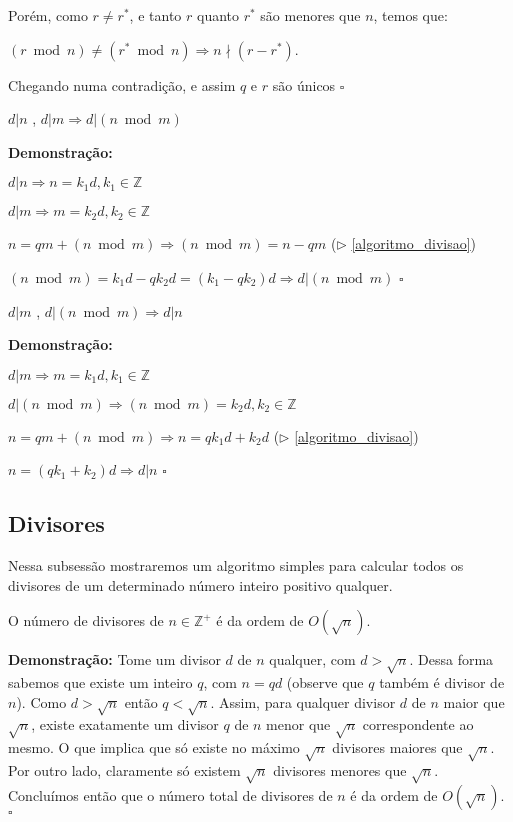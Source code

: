 Porém, como $r \neq r^*$, e tanto $r$ quanto $r^*$ são menores que $n$, temos que: 

$(r\bmod n) \neq (r^*\bmod n) \Rightarrow n \nmid (r - r^*)$.

Chegando numa contradição, e assim $q$ e $r$ são únicos $\square$ \\

\begin{corollary}\label{divisibilidade_modular}
$d|n$ , $d|m \Rightarrow d|(n \bmod m)$
\end{corollary}
\textbf{Demonstração:}

$d|n \Rightarrow n = k_1d, k_1 \in \mathbb{Z}$

$d|m \Rightarrow m = k_2d, k_2 \in \mathbb{Z}$

$n = qm + (n \bmod m) \Rightarrow (n \bmod m) = n - qm$ ($\triangleright$ \autoref{algoritmo_divisao})

$(n \bmod m) = k_1d - qk_2d = (k_1 - qk_2)d \Rightarrow d|(n \bmod m)$ $\square$


\begin{corollary}\label{divisibilidade_modular2}
$d|m$ , $d|(n \bmod m) \Rightarrow d|n$
\end{corollary}
\textbf{Demonstração:}

$d|m \Rightarrow m = k_1d, k_1 \in \mathbb{Z}$

$d|(n \bmod m) \Rightarrow (n \bmod m) = k_2d, k_2 \in \mathbb{Z}$

$n = qm + (n \bmod m) \Rightarrow n = qk_1d + k_2d$ ($\triangleright$ \autoref{algoritmo_divisao})

$n = (qk_1 + k_2)d \Rightarrow d|n$ $\square$


\subsection{Divisores}
Nessa subsessão mostraremos um algoritmo simples para calcular todos os divisores de um determinado número inteiro positivo qualquer.

\begin{theorem} 
O número de divisores de $n \in \mathbb{Z}^{+}$ é da ordem de $O(\sqrt{n})$.
\end{theorem}
\textbf{Demonstração:}
Tome um divisor $d$ de $n$ qualquer, com $d > \sqrt{n}$. Dessa forma sabemos que existe um inteiro $q$, com $n=qd$ (observe que $q$ também é divisor de $n$). 
Como $d > \sqrt{n}$ então $q < \sqrt{n}$. Assim, para qualquer divisor $d$ de $n$ maior que $\sqrt{n}$, existe exatamente um divisor $q$ de $n$ menor que $\sqrt{n}$ correspondente ao mesmo.
O que implica que só existe no máximo $\sqrt{n}$ divisores maiores que $\sqrt{n}$. Por outro lado, claramente só existem $\sqrt{n}$ divisores menores que $\sqrt{n}$.
Concluímos então que o número total de divisores de $n$ é da ordem de $O(\sqrt{n})$. $\square$
\\

